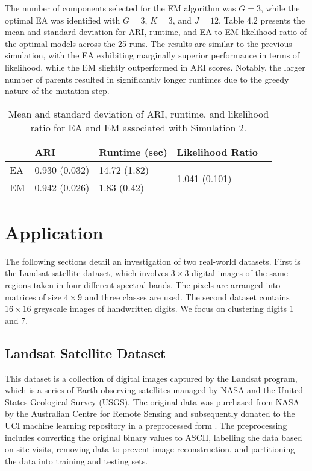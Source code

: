 \documentclass[12pt]{report}
\begin{document}
The number of components selected for the EM algorithm was $G=3$, while the optimal EA was identified with $G=3$, $K=3$, and $J=12$. Table 4.2 presents the mean and standard deviation for ARI, runtime, and EA to EM likelihood ratio of the optimal models across the 25 runs. The results are similar to the previous simulation, with the EA exhibiting marginally superior performance in terms of likelihood, while the EM slightly outperformed in ARI scores. Notably, the larger number of parents resulted in significantly longer runtimes due to the greedy nature of the mutation step.

\begin{table}[!ht]
  \caption{Mean and standard deviation of ARI, runtime, and likelihood ratio for EA and EM associated with Simulation 2.}
    \vspace{0.5cm}
  \begin{tabularx}{\textwidth}{l *{3}{X}c}
  \toprule
    &\textbf{ARI}& \textbf{Runtime (sec)}  & \textbf{Likelihood Ratio} \\
  \midrule
  EA & 0.930 (0.032)     & 14.72 (1.82) & \multirow{2}{*}{1.041 (0.101)}  \\
  EM & 0.942 (0.026)    & 1.83 (0.42)   \\
  \bottomrule
  \end{tabularx}
\end{table}






\chapter{Application}
The following sections detail an investigation of two real-world datasets. First is the Landsat satellite dataset, which involves $3 \times 3$ digital images of the same regions taken in four different spectral bands. The pixels are arranged into matrices of size $4 \times 9$ and three classes are used. The second dataset contains $16 \times 16$ greyscale images of handwritten digits. We focus on clustering digits 1 and 7.  




\section{Landsat Satellite Dataset}
This dataset is a collection of digital images captured by the Landsat program, which is a series of Earth-observing satellites managed by NASA and the United States Geological Survey (USGS). The original data was purchased from NASA by the Australian Centre for Remote Sensing and subsequently donated to the UCI machine learning repository in a preprocessed form \citep{landsat}. The preprocessing includes converting the original binary values to ASCII, labelling the data based on site visits, removing data to prevent image reconstruction, and partitioning the data into training and testing sets. 
\end{document}
